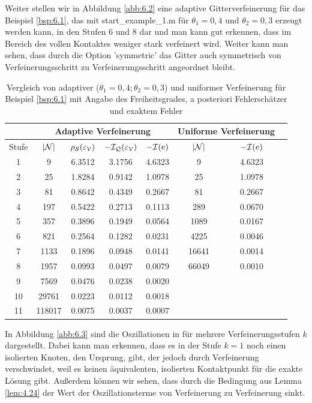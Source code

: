 \begin{bsp}
Weiter stellen wir in Abbildung \ref{abb:6.2} eine adaptive Gitterverfeinerung für das Beispiel \ref{bsp:6.1}, das mit {\ttfamily start_example_1.m} für $\theta_1 = 0,4$ und $\theta_2 = 0,3$ erzeugt werden kann, in den Stufen 6 und 8 dar und man kann gut erkennen, dass im Bereich des vollen Kontaktes weniger stark verfeinert wird. Weiter kann man sehen, dass durch die Option {\ttfamily 'symmetric'} das Gitter auch symmetrisch  von Verfeinerungsschritt zu Verfeinerungsschritt angeordnet bleibt.


\begin{table}[h]
\centering
\begin{tabular}[c]{|c|c|c|c|c|c|c|c|}
	\hline
	 & \multicolumn{4}{c|}{Adaptive Verfeinerung} & \multicolumn{2}{c|}{Uniforme Verfeinerung} \\
	\hline
	Stufe & $\lvert \mathcal N\rvert$ & $\rho_{\mathcal S}(\varepsilon_{\mathcal V})$ & $-\mathcal I_{\mathcal Q} (\varepsilon_{\mathcal V})$ & $-\mathcal I(e)$ & $\lvert \mathcal N\rvert$ & $-\mathcal I (e)$ \\
	\hline
	 1 &  9  & 6.3512 & 3.1756 & 4.6323 & 9  & 4.6323 \\
	 2 & 25 & 1.8284 & 0.9142 & 1.0978 & 25 & 1.0978 \\
	 3 & 81 & 0.8642 & 0.4349 & 0.2667 & 81 & 0.2667 \\
	 4 & 197 & 0.5422 &0.2713 & 0.1113 & 289 & 0.0670 \\
	 5 & 357 & 0.3896 & 0.1949 & 0.0564 & 1089 &0.0167  \\
	 6 & 821 & 0.2564 & 0.1282 & 0.0231 &4225 &  0.0046 \\
	 7 & 1133 & 0.1896 & 0.0948 & 0.0141 & 16641 & 0.0014 \\
	 8 & 1957 & 0.0993 & 0.0497 & 0.0079 & 66049 & 0.0010 \\
	 9 & 7569 & 0.0476 & 0.0238 & 0.0020 & & \\
	 10 & 29761 & 0.0223 & 0.0112 & 0.0018 & & \\
	 11 & 118017 & 0.0075 & 0.0037 & 0.0007 & & \\
	\hline
\end{tabular}
\caption[Vergleich von adaptiver und uniformer Verfeinerung für Beispiel \ref{bsp:6.1}]{\label{tab:6.1}Vergleich von adaptiver ($\theta_1 = 0,4;\theta_2 = 0,3$) und uniformer Verfeinerung für Beispiel \ref{bsp:6.1} mit Angabe des Freiheitsgrades, a posteriori Fehlerschätzer und exaktem Fehler}
\end{table}


In Abbildung \ref{abb:6.3} sind die Oszillationen in für mehrere Verfeinerungsstufen $k$ dargestellt. Dabei kann man erkennen, dass es in der Stufe $k=1$ noch einen isolierten Knoten, den Ursprung, gibt, der jedoch durch Verfeinerung verschwindet, weil es keinen äquivalenten, isolierten Kontaktpunkt für die exakte Lösung gibt. Außerdem können wir sehen, dass durch die Bedingung aus Lemma \ref{lem:4.24} der Wert der Oszillationsterme von Verfeinerung zu Verfeinerung sinkt.




\end{bsp}
